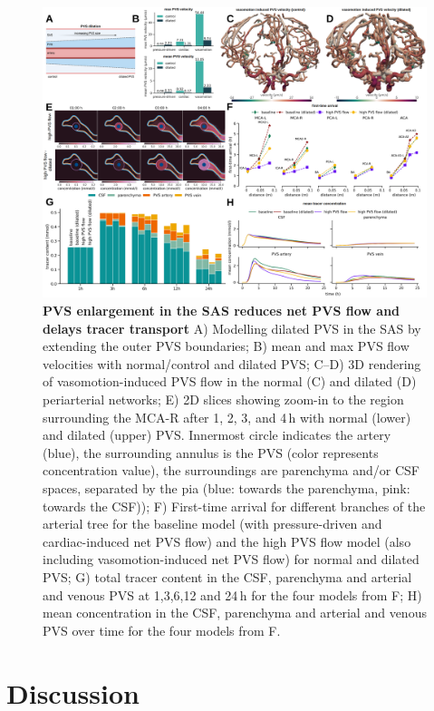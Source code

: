 \documentclass[fleqn,10pt]{wlscirep}
\begin{document}
\begin{figure}
    \centering
    \includegraphics[width=1 \textwidth]{figures/figure5.png}
\caption{\textbf{PVS enlargement in the SAS reduces net PVS flow and delays tracer transport}
A) Modelling dilated PVS in the SAS by extending the outer PVS boundaries;
B) mean and max PVS flow velocities with normal/control and dilated PVS;
C--D) 3D rendering of vasomotion-induced PVS flow in the normal (C) and dilated (D) periarterial networks; 
E) 2D slices showing zoom-in to the region surrounding the MCA-R after 1, 2, 3, and 4\,h with normal (lower) and dilated (upper) PVS. Innermost circle indicates the artery (blue), the surrounding annulus is the PVS (color represents concentration value), the surroundings are parenchyma and/or CSF spaces, separated by the pia (blue: towards the parenchyma, pink: towards the CSF)); 
F) First-time arrival for different branches of the arterial tree for the baseline model (with pressure-driven and cardiac-induced net PVS flow) and the high PVS flow model (also including vasomotion-induced net PVS flow) for normal and dilated PVS;
G) total tracer content in the CSF, parenchyma and arterial and venous PVS at 1,3,6,12 and 24\,h for the four models from F;
H) mean concentration in the CSF, parenchyma and arterial and venous PVS over time for the four models from F.
}
    \label{fig:enlargement}
\end{figure}

\section*{Discussion}
\end{document}
